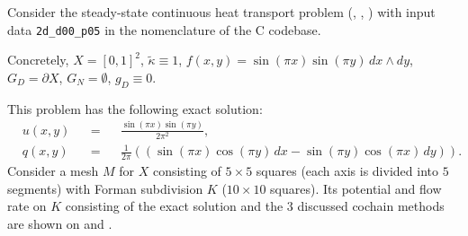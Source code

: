 \begin{example}
  \label{cmc/diffusion/continuous/steady_state/examples/2d_d00_p05-example}
  Consider the steady-state continuous heat transport problem
  (,
   ,
   )
  with input data \verb|2d_d00_p05| in the nomenclature of the C codebase.

  Concretely,
    $X = [0, 1]^2$,
    $\tilde{\kappa} \equiv 1$,
    $f(x, y) = \sin(\pi x) \sin(\pi y) \, d x \wedge d y$,
    $G_D = \partial X$,
    $G_N = \emptyset$,
    $g_D \equiv 0$.

  This problem has the following exact solution:
  \begin{subequations}
    \begin{alignat}{3}
      & u(x, y) && = && \frac{\sin(\pi x) \sin(\pi y)}{2 \pi^2}, \\
      & q(x, y) && = &&
        \frac{1}{2 \pi}
        ((\sin(\pi x) \cos(\pi y) \, d x - \sin(\pi y) \cos(\pi x)\, d y)).
    \end{alignat}
  \end{subequations}
  Consider a mesh $M$ for $X$ consisting of $5 \times 5$ squares (each axis is
  divided into $5$ segments) with Forman subdivision $K$
  ($10 \times 10$ squares).
  Its potential and flow rate on $K$ consisting of the exact solution and the
  $3$ discussed cochain methods are shown on
  and
  .
\end{example}
